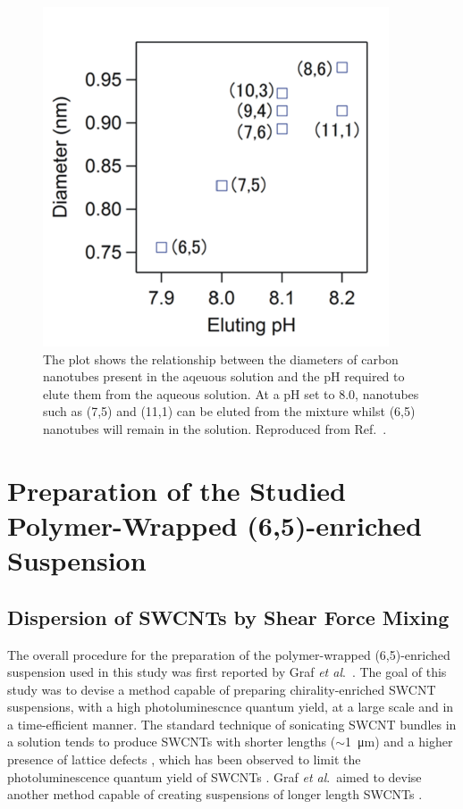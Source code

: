 \begin{figure}[H]
	\centering
	\includegraphics{images/chapter_methods/elute_ph}
	\caption{The plot shows the relationship between the diameters of carbon nanotubes present in the aqeuous solution and the pH required to elute them from the aqueous solution. At a pH set to $8.0$, nanotubes such as (7,5) and (11,1) can be eluted from the mixture whilst (6,5) nanotubes will remain in the solution.  Reproduced from Ref.\ \cite{ichinose2017extraction}.}
	\label{fig:elute_ph}
\end{figure}

\section{Preparation of the Studied Polymer-Wrapped (6,5)-enriched Suspension}

\subsection{Dispersion of SWCNTs by Shear Force Mixing}

The overall procedure for the preparation of the polymer-wrapped (6,5)-enriched suspension used in this study was first reported by Graf \textit{et al}.\ \cite{graf2016large}. The goal of this study was to devise a method capable of preparing chirality-enriched SWCNT suspensions, with a high photoluminescnce quantum yield, at a large scale and in a time-efficient manner. The standard technique of sonicating SWCNT bundles in a solution tends to produce SWCNTs with shorter lengths ($\sim$\SI{1}{\micro\meter}) and a higher presence of lattice defects \cite{khan2010high}, which has been observed to limit the photoluminescence quantum yield of SWCNTs \cite{mouri2012dispersion}. Graf \textit{et al}.\ aimed to devise another method capable of creating suspensions of longer length SWCNTs \cite{graf2016large}.

